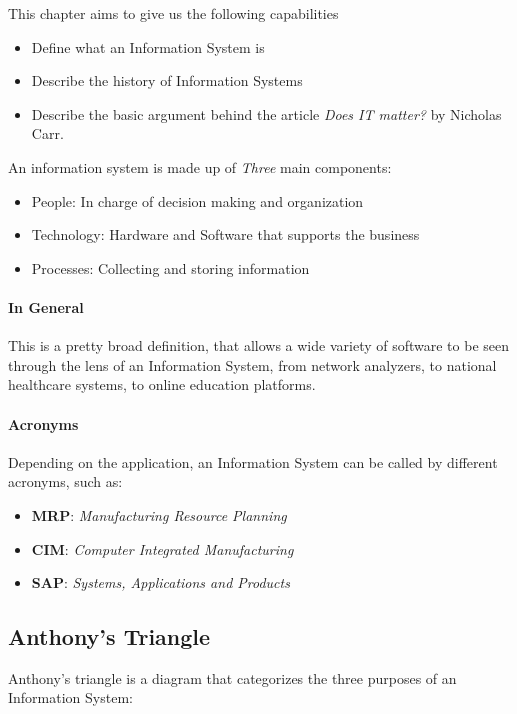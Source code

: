 \documentclass[openright, twoside, twocolumn, a4paper, 10pt]{report}
\begin{document}
This chapter aims to give us the following capabilities

\begin{itemize}
	\item Define what an Information System is
	\item Describe the history of Information Systems
	\item Describe the basic argument behind the article \emph{Does IT matter?} by Nicholas Carr.
\end{itemize}

An information system is made up of \emph{Three} main components:

\begin{itemize}
	\item People: In charge of decision making and organization
	\item Technology: Hardware and Software that supports the business
	\item Processes: Collecting and storing information
\end{itemize}

\paragraph{In General}
This is a pretty broad definition, that allows a wide variety of software to be seen through the lens of an Information System,
from network analyzers, to national healthcare systems, to online education platforms.

\paragraph{Acronyms}
Depending on the application, an Information System can be called by different acronyms, such as:

\begin{itemize}
	\item \textbf{MRP}: \emph{Manufacturing Resource Planning}
	\item \textbf{CIM}: \emph{Computer Integrated Manufacturing}
	\item \textbf{SAP}: \emph{Systems, Applications and Products}
\end{itemize}

\subsection{Anthony's Triangle}

Anthony's triangle is a diagram that categorizes the three purposes of an Information System:
\end{document}
